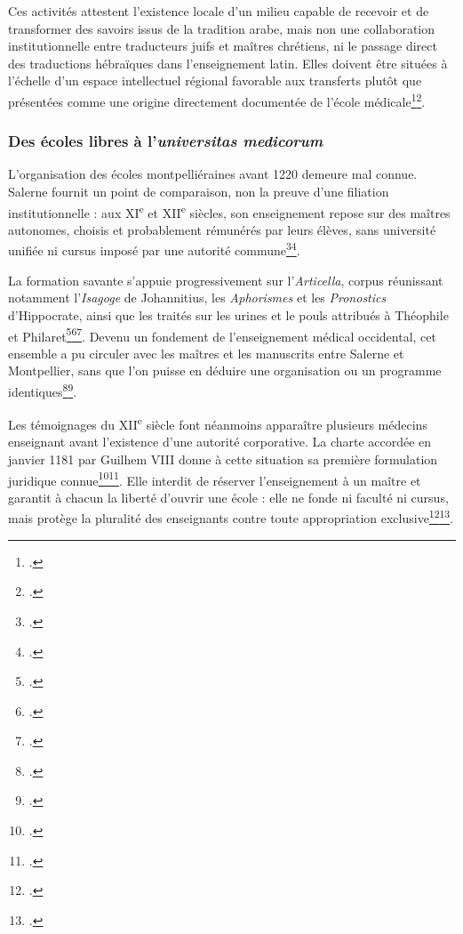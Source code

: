 Ces activités attestent l'existence locale d'un milieu capable de recevoir et de transformer des savoirs issus de la tradition arabe, mais non une collaboration institutionnelle entre traducteurs juifs et maîtres chrétiens, ni le passage direct des traductions hébraïques dans l'enseignement latin. Elles doivent être situées à l'échelle d'un espace intellectuel régional favorable aux transferts plutôt que présentées comme une origine directement documentée de l'école médicale\footcite{Touati2018}\footcite{Iancu2025}.

\subsubsection{Des écoles libres à l'\emph{universitas medicorum}}

L'organisation des écoles montpelliéraines avant 1220 demeure mal connue. Salerne fournit un point de comparaison, non la preuve d'une filiation institutionnelle : aux XI\textsuperscript{e} et XII\textsuperscript{e} siècles, son enseignement repose sur des maîtres autonomes, choisis et probablement rémunérés par leurs élèves, sans université unifiée ni cursus imposé par une autorité commune\footcite{VergerSalerne1999}\footcite{Verger2021}.

La formation savante s'appuie progressivement sur l'\emph{Articella}, corpus réunissant notamment l'\emph{Isagoge} de Johannitius, les \emph{Aphorismes} et les \emph{Pronostics} d'Hippocrate, ainsi que les traités sur les urines et le pouls attribués à Théophile et Philaret\footcite{Articella1998}\footcite{Siraisi1990}\footcite{OBoyle2000}. Devenu un fondement de l'enseignement médical occidental, cet ensemble a pu circuler avec les maîtres et les manuscrits entre Salerne et Montpellier, sans que l'on puisse en déduire une organisation ou un programme identiques\footcite{VergerSalerne1999}\footcite{Moulinier2003Montpellier}.

Les témoignages du XII\textsuperscript{e} siècle font néanmoins apparaître plusieurs médecins enseignant avant l'existence d'une autorité corporative. La charte accordée en janvier 1181 par Guilhem VIII donne à cette situation sa première formulation juridique connue\footcite[fol.~96, vue~100/225 de la version numérisée]{MontpellierAMAA1}\footcite{GuilhemVIII1181}. Elle interdit de réserver l'enseignement à un maître et garantit à chacun la liberté d'ouvrir une école : elle ne fonde ni faculté ni cursus, mais protège la pluralité des enseignants contre toute appropriation exclusive\footcite{DarricauLugat1999}\footcite{Moulinier2003Montpellier}.

